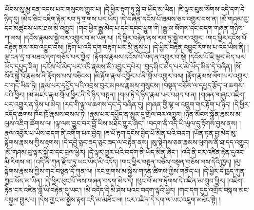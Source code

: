 ཡོངས་སུ་མྱ་ངན་འདས་པར་གསུངས་གྱུར་པ། །དེ་ཕྱིར་རྟག་ཏུ་སྐྱེ་བ་ཡོད་མ་ཡིན། །ཇི་ལྟར་བུམ་སོགས་འདི་དག་དེ་ཉིད་དུ། །མེད་ཅིང་འཇིག་རྟེན་རབ་ཏུ་གྲགས་པར་ཡོད། །དེ་བཞིན་དངོས་པོ་ཐམས་ཅད་འགྱུར་བས་ན། །མོ་གཤམ་བུ་དང་མཚུངས་པར་ཐལ་མི་འགྱུར། །གང་ཕྱིར་རྒྱུ་མེད་པ་དང་དབང་ཕྱུག་གི །རྒྱུ་ལ་སོགས་དང་བདག་གཞན་གཉིས་ཀ་ལས། །དངོས་རྣམས་སྐྱེ་བར་འགྱུར་བ་མ་ཡིན་པ། །དེ་ཕྱིར་བརྟེན་ནས་རབ་ཏུ་སྐྱེ་བར་འགྱུར། །གང་ཕྱིར་དངོས་པོ་བརྟེན་ནས་རབ་འབྱུང་བས། །རྟོག་པ་འདི་དག་བརྟག་པར་མི་ནུས་པ། །དེ་ཕྱིར་བརྟེན་འབྱུང་རིགས་པ་འདི་ཡིས་ནི། །ལྟ་ངན་དྲ་བ་མཐའ་དག་གཅོད་པར་བྱེད། །རྟོགས་རྣམས་དངོས་པོ་ཡོད་ན་འགྱུར་བ་སྟེ། །དངོས་པོ་ཇི་ལྟར་མེད་པར་ཡོད་དཔྱད་ཟིན། །དངོས་པོ་མེད་པར་འདི་རྣམས་མི་འབྱུང་དཔེར། །བུད་ཤིང་མེད་པར་མེ་ཡོད་མིན་དེ་བཞིན། །སོ་སོའི་སྐྱེ་བོ་རྣམས་ནི་རྟོགས་པས་བཅིངས། །མི་རྟོག་རྣལ་འབྱོར་པ་ནི་གྲོལ་འགྱུར་བས། །རྟོག་རྣམས་ལོག་པར་འགྱུར་བ་གང་ཡིན་ཏེ། །རྣམ་པར་དཔྱོད་པའི་འབྲས་བུར་མཁས་རྣམས་གསུངས། །བསྟན་བཅོས་ལ་དཔྱད་རྩོད་ལ་ཆགས་པའི་ཕྱིར། །མ་མཛད་རྣམ་གྲོལ་ཕྱིར་ནི་དེ་ཉིད་བསྟན། །གལ་ཏེ་དེ་ཉིད་རྣམ་པར་བཤད་པ་ན། །གཞན་གཞུང་འཇིག་པར་འགྱུར་ན་ཉེས་པ་མེད། །རང་གི་ལྟ་ལ་ཆགས་དང་དེ་བཞིན་དུ། །གཞན་གྱི་ལྟ་ལ་འཁྲུག་གང་རྟོག་པ་ཉིད། །དེ་ཕྱིར་འདོད་ཆགས་ཁོང་ཁྲོ་རྣམས་བསལ་ཏེ། །རྣམ་པར་དཔྱོད་ན་མྱུར་དུ་གྲོལ་བར་འགྱུར། །ཉོན་མོངས་སྐྱོན་རྣམས་མ་ལུས་འཇིག་ཚོགས་ལ། །ལྟ་ལས་བྱུང་བར་བློ་ཡིས་མཐོང་གྱུར་ཞིང་། །བདག་ནི་འདི་ཡི་ཡུལ་དུ་རྟོགས་བྱས་ནས། །རྣལ་འབྱོར་པ་ཡིས་བདག་ནི་འགོག་པར་བྱེད། །ཟ་པོ་རྟག་དངོས་བྱེད་པོ་མིན་པའི་བདག །ཡོན་ཏན་བྱ་མེད་མུ་སྟེགས་རྣམས་ཀྱིས་རྟགས། །དེ་དབྱེ་ཅུང་ཟད་ཅུང་ཟད་ལ་བརྟེན་ནས། །མུ་སྟེགས་ཅན་རྣམས་ལུགས་ནི་ཐ་དད་འགྱུར། །མོ་གཤམ་བུ་ལྟར་སྐྱེ་བ་དང་བྲལ་ཕྱིར། །དེ་ལྟར་གྱུར་པའི་བདག་ནི་ཡོད་མིན་ཞིང་། །འདི་ནི་ངར་འཛིན་རྟེན་དུའང་མི་རིགས་ལ། །འདི་ནི་ཀུན་རྫོབ་ཏུ་ཡང་ཡོད་མི་འདོད། །གང་ཕྱིར་བསྟན་བཅོས་བསྟན་བཅོས་ལས་དེའི་ཁྱད། །མུ་སྟེགས་རྣམས་ཀྱིས་གང་བསྟན་དེ་ཀུན་ལ། །རང་གྲགས་མ་སྐྱེས་གཏན་ཚིགས་ཀྱིས་གནོད་པ། །དེ་ཕྱིར་དེ་ཁྱད་ཀུན་ཀྱང་ཡོད་མ་ཡིན། །དེ་ཕྱིར་ཕུང་པོ་ལས་གཞན་བདག་མེད་དེ། །ཕུང་པོ་མ་གཏོགས་དེ་འཛིན་མ་གྲུབ་ཕྱིར། །འཇིག་རྟེན་ངར་འཛིན་བློ་ཡི་བརྟེན་དུ་ཡང་། །མི་འདོད་དེ་མི་ཤེས་པའང་བདག་ལྟའི་ཕྱིར། །གང་དག་དུད་འགྲོར་བསྐལ་མང་བསྐྱལ་གྱུར་པ། །དེས་ཀྱང་མ་སྐྱེས་རྟག་འདི་མ་མཐོང་ལ། །ངར་འཛིན་དེ་དག་ལ་ཡང་འཇུག་མཐོང་སྟེ། །
